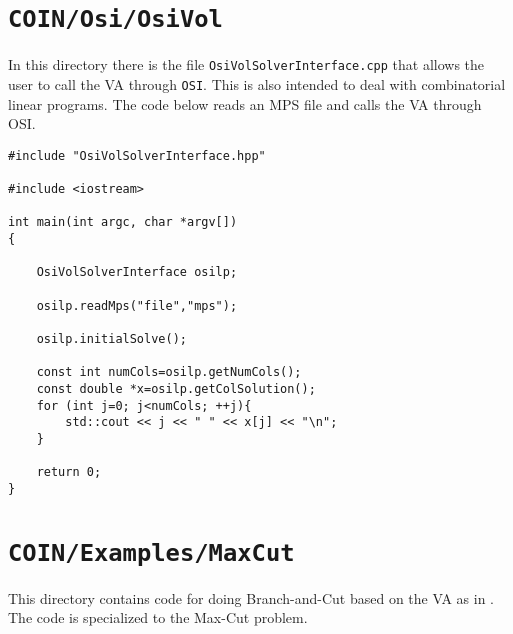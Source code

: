 \documentclass{article}
\begin{document}
\section{{\tt COIN/Osi/OsiVol}}

In this directory there is the file {\tt OsiVolSolverInterface.cpp}
that allows the user to call the VA through {\tt OSI}. This is also
intended to deal with combinatorial linear programs. The code below
reads an MPS file and calls the VA through OSI.

\begin{verbatim}
#include "OsiVolSolverInterface.hpp"

#include <iostream>

int main(int argc, char *argv[])
{
    
    OsiVolSolverInterface osilp;
    
    osilp.readMps("file","mps");
    
    osilp.initialSolve();

    const int numCols=osilp.getNumCols();
    const double *x=osilp.getColSolution();
    for (int j=0; j<numCols; ++j){
        std::cout << j << " " << x[j] << "\n";
    }
   
    return 0;
}  
\end{verbatim}

%

\section{{\tt COIN/Examples/MaxCut}}

This directory contains code for doing Branch-and-Cut based on the
VA as in \cite{BL}. The code is specialized to the Max-Cut problem.



\end{document}
